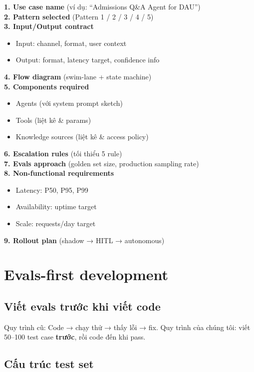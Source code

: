 \documentclass[11pt,a4paper]{article}
\begin{document}
\begin{tpl}[title=Flow Design Document (FDD) — Template]
\textbf{1. Use case name} (ví dụ: ``Admissions Q\&A Agent for DAU'')\\
\textbf{2. Pattern selected} (Pattern 1 / 2 / 3 / 4 / 5)\\
\textbf{3. Input/Output contract}
\begin{itemize}
\item Input: channel, format, user context
\item Output: format, latency target, confidence info
\end{itemize}
\textbf{4. Flow diagram} (swim-lane + state machine)\\
\textbf{5. Components required}
\begin{itemize}
\item Agents (với system prompt sketch)
\item Tools (liệt kê \& params)
\item Knowledge sources (liệt kê \& access policy)
\end{itemize}
\textbf{6. Escalation rules} (tối thiểu 5 rule)\\
\textbf{7. Evals approach} (golden set size, production sampling rate)\\
\textbf{8. Non-functional requirements}
\begin{itemize}
\item Latency: P50, P95, P99
\item Availability: uptime target
\item Scale: requests/day target
\end{itemize}
\textbf{9. Rollout plan} (shadow → HITL → autonomous)
\end{tpl}

\clearpage

\section{Evals-first development}

\subsection{Viết evals trước khi viết code}

Quy trình cũ: Code → chạy thử → thấy lỗi → fix. Quy trình của chúng tôi: viết
50--100 test case \textbf{trước}, rồi code đến khi pass.

\subsection{Cấu trúc test set}
\end{document}
